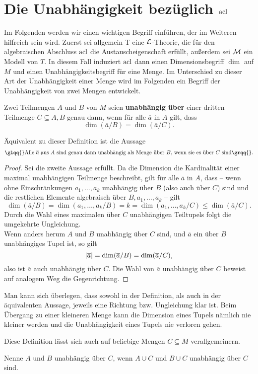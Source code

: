 \chapter{Die Unabhängigkeit bezüglich $\operatorname{acl}$}\label{Kapitel 0}
Im Folgenden werden wir einen wichtigen Begriff einführen, der im Weiteren hilfreich sein wird. Zuerst sei allgemein T eine $\mathcal{L}$-Theorie, die für den algebraischen Abschluss $\operatorname{acl}$ die Austauscheigenschaft erfüllt, außerdem sei $\mathcal{M}$ ein Modell von $T$. In diesem Fall induziert $\operatorname{acl}$ dann einen Dimensionsbegriff $\dim$ auf $M$ und einen Unabhängigkeitsbegriff für eine Menge. Im Unterschied zu dieser Art der Unabhängigkeit einer Menge wird im Folgenden ein Begriff der Unabhängigkeit von zwei Mengen entwickelt.

\begin{definition}
	Zwei Teilmengen $A$ und $B$ von $M$ seien \textbf{unabhängig über} einer dritten Teilmenge $C\subseteq A,B$ genau dann, wenn für alle $\overline{a}$ in $A$ gilt, dass $$\dim(\overline{a}/B)=\dim(\overline{a}/C).$$
\end{definition}

\begin{lemma}
	Äquivalent zu dieser Definition ist die Aussage
	$$\glqq{}\text{Alle }\overline{a}\text{ aus }A\text{ sind genau dann unabhängig als Menge über }B\text{, wenn sie es über }C\text{ sind}\grqq{}.$$
\end{lemma}
\begin{proof}
	Sei die zweite Aussage erfüllt. Da die Dimension die Kardinalität einer maximal unabhängigen Teilmenge beschreibt, gilt für alle $\overline{a}$ in $A$, dass \--- wenn ohne Einschränkungen $a_1,\dots,a_k$ unabhängig über $B$ (also auch über $C$) sind und die restlichen Elemente algebraisch über $B,a_1,\dots,a_k$ \--- gilt $$\dim(\overline{a}/B)=\dim(a_1,\dots,a_k/B)=k=\dim(a_1,\dots,a_k/C)\leq\dim(\overline{a}/C).$$
	Durch die Wahl eines maximalen über $C$ unabhängigen Teiltupels folgt die umgekehrte Ungleichung.\\
	Wenn anders herum $A$ und $B$ unabhängig über $C$ sind, und $\overline{a}$ ein über $B$ unabhängiges Tupel ist, so gilt
	$${\left| \overline{a} \right|}=\dim(\overline{a}/B)=\dim(\overline{a}/C),$$
	also ist $\overline{a}$ auch unabhängig über $C$. Die Wahl von $\overline{a}$ unabhängig über $C$ beweist auf analogem Weg die Gegenrichtung.
\end{proof}

\begin{remark}
	Man kann sich überlegen, dass sowohl in der Definition, als auch in der äquivalenten Aussage, jeweils eine Richtung bzw. Ungleichung klar ist. Beim Übergang zu einer kleineren Menge kann die Dimension eines Tupels nämlich nie kleiner werden und die Unabhängigkeit eines Tupels nie verloren gehen.
\end{remark}
\newpage
Diese Definition lässt sich auch auf beliebige Mengen $C\subseteq M$ verallgemeinern.
\begin{definition}
	Nenne $A$ und $B$ unabhängig über $C$, wenn $A\cup C$ und $B\cup C$ unabhängig über $C$ sind.
\end{definition}

